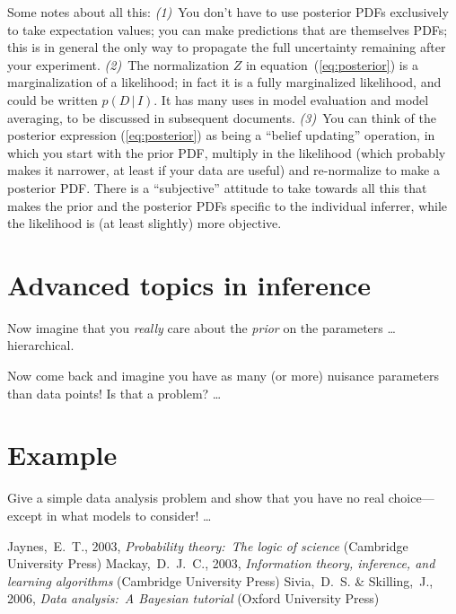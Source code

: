 \documentclass[12pt,twoside]{article}
\newcommand{\documentname}{document}
\newcommand{\documentnames}{\documentname s}
\newcommand{\equationname}{equation}
\newcounter{problem}
\newcommand{\given}{\,|\,}
\begin{document}
Some notes about all this: \textsl{(1)}~You don't have to use
posterior PDFs exclusively to take expectation values; you can make
predictions that are themselves PDFs; this is in general the only way
to propagate the full uncertainty remaining after your
experiment. \textsl{(2)}~The normalization $Z$ in
\equationname~(\ref{eq:posterior}) is a marginalization of a
likelihood; in fact it is a fully marginalized likelihood, and could
be written $p(D \given I)$.  It has many uses in model evaluation and
model averaging, to be discussed in subsequent \documentnames.
\textsl{(3)}~You can think of the posterior expression
(\ref{eq:posterior}) as being a ``belief updating'' operation, in
which you start with the prior PDF, multiply in the likelihood (which
probably makes it narrower, at least if your data are useful) and
re-normalize to make a posterior PDF.  There is a ``subjective''
attitude to take towards all this that makes the prior and the
posterior PDFs specific to the individual inferrer, while the
likelihood is (at least slightly) more objective.

\section{Advanced topics in inference}

Now imagine that you \emph{really} care about the \emph{prior} on the parameters \ldots hierarchical.

Now come back and imagine you have as many (or more) nuisance parameters than data points!  Is that a problem? \ldots

\section{Example}

Give a simple data analysis problem and show that you have no real
choice---except in what models to consider! \ldots

\clearpage
{}\theendnotes

\clearpage
\begin{thebibliography}{}
  Jaynes,~E.~T., 2003,
  \textit{Probability theory:\ The logic of science} (Cambridge University Press)
  Mackay,~D.~J.~C., 2003,
  \textit{Information theory, inference, and learning algorithms} (Cambridge University Press)
  Sivia,~D.~S. \& Skilling,~J., 2006,
  \textit{Data analysis:\ A Bayesian tutorial} (Oxford University Press)
\end{thebibliography}
\end{document}
